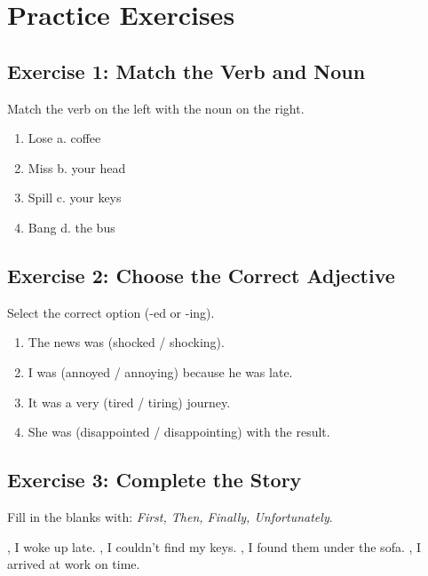 \section{Practice Exercises}

\subsection{Exercise 1: Match the Verb and Noun}
Match the verb on the left with the noun on the right.

\begin{enumerate}
    \item Lose \hspace{3cm} a. coffee
    \item Miss \hspace{3cm} b. your head
    \item Spill \hspace{3cm} c. your keys
    \item Bang \hspace{3cm} d. the bus
\end{enumerate}

\subsection{Exercise 2: Choose the Correct Adjective}
Select the correct option (-ed or -ing).

\begin{enumerate}
    \item The news was (shocked / shocking).
    \item I was (annoyed / annoying) because he was late.
    \item It was a very (tired / tiring) journey.
    \item She was (disappointed / disappointing) with the result.
\end{enumerate}

\subsection{Exercise 3: Complete the Story}
Fill in the blanks with: \textit{First, Then, Finally, Unfortunately}.

\underline{\hspace{2cm}}, I woke up late. \underline{\hspace{2cm}}, I couldn't find my keys. \underline{\hspace{2cm}}, I found them under the sofa. \underline{\hspace{2cm}}, I arrived at work on time.

